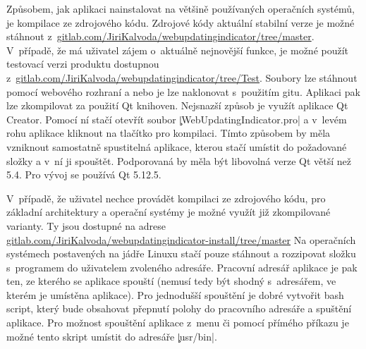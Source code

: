 Způsobem, jak aplikaci nainstalovat na většině používaných operačních systémů, je kompilace ze zdrojového kódu.
Zdrojové kódy aktuální stabilní verze je možné stá\-hnout z~\url{gitlab.com/JiriKalvoda/webupdatingindicator/tree/master}.
V~pří\-padě, že má uživatel zájem o~aktuálně nejnovější funkce, je možné použít testovací verzi produktu dostupnou z~\url{gitlab.com/JiriKalvoda/webupdatingindicator/tree/Test}.
Soubory lze stáhnout pomocí webového rozhraní a nebo je lze naklonovat s~použitím gitu.
Aplikaci pak lze zkompilovat za použití Qt knihoven.
Nejsnazší způsob je využít aplikace Qt Creator. Pomocí ní stačí otevřít soubor \c|WebUpdatingIndicator.pro| a v~levém rohu aplikace kliknout na tlačítko pro kompilaci.
Tímto způsobem by měla vzniknout samostatně spustitelná aplikace, kterou stačí umístit do požadované složky a v~ní ji spouštět.
Podporovaná by měla být libovolná verze Qt větší než 5.4.
Pro vývoj se používá Qt 5.12.5.

V~případě, že uživatel nechce provádět kompilaci ze zdrojového kódu, pro základní architektury a operační systémy je možné využít již zkompilované varianty.
Ty jsou dostupné na adrese \url{gitlab.com/JiriKalvoda/webupdatingindicator-install/tree/master}
Na operačních systémech postavených na jádře Linuxu stačí pouze stáhnout a rozzipovat složku s~programem do uživatelem zvoleného adresáře.
Pracovní adresář aplikace je pak ten, ze kterého se aplikace spouští (nemusí tedy být shodný s~adresářem, ve kterém je umístěna aplikace).
Pro jednodušší spouštění je dobré vytvořit bash script, který bude obsahovat přepnutí polohy do pracovního adresáře a spuštění aplikace.
Pro možnost spouštění aplikace z~menu či pomocí přímého příkazu je možné tento skript umístit do adresáře \c|usr/bin|.


